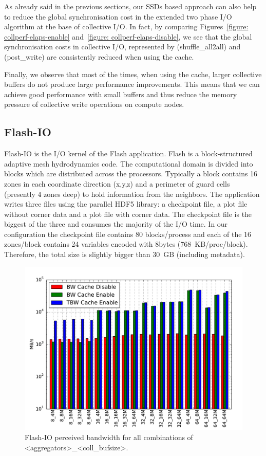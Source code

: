As already said in the previous sections, our SSDs based approach can also help to reduce the global synchronisation cost in the extended two phase I/O algorithm at the base of collective I/O.
In fact, by comparing Figures~\ref{figure: collperf-elaps-enable} and~\ref{figure: collperf-elaps-disable}, we see that the global synchronisation costs in collective I/O, represented by  (shuffle\_all2all) and  (post\_write) are consistently reduced when using the cache.

Finally, we observe that most of the times, when using the cache, larger collective buffers do not produce large performance improvements. This means that we can achieve good performance with small buffers and thus reduce the memory pressure of collective write operations on compute nodes.

\subsection{Flash-IO}
\label{subsec: flash}
Flash-IO is the I/O kernel of the Flash application. Flash is a block-structured adaptive mesh hydrodynamics code. The computational domain is divided into blocks which are distributed across the processors. Typically a block contains 16 zones in each coordinate direction (x,y,z) and a perimeter of guard cells (presently 4 zones deep) to hold information from the neighbors. The application writes three files using the parallel HDF5 library: a checkpoint file, a plot file without corner data and a plot file with corner data. The checkpoint file is the biggest of the three and consumes the majority of the I/O time. In our configuration the checkpoint file contains 80 blocks/process and each of the 16 zones/block contains 24 variables encoded with 8bytes (768~KB/proc/block). Therefore, the total size is slightly bigger than 30~GB (including metadata).

\begin{figure}[t!]
  \centering
  \includegraphics[width=0.95\columnwidth]{figures/flash_32GB_30sec_bw}
  \caption{Flash-IO perceived bandwidth for all combinations of <aggregators>\_<coll\_bufsize>.} %
  \label{figure: flash-bw}
\end{figure}

